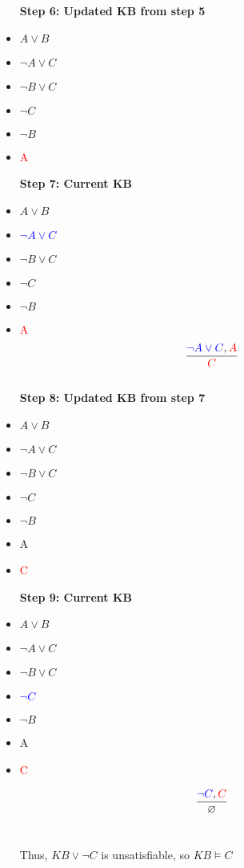 \documentclass{article}
\begin{document}
\begin{itemize}
    \textbf{Step 6: Updated KB from step 5}\\
    \item $A \lor B$
    \item $\neg A \lor C$
    \item $\neg B \lor C$
    \item $\neg C$
    \item $\neg B$
    \item \textcolor{red}{A}\\
    
    \par \textbf{Step 7: Current KB}\\
    \item $A \lor B$
    \item \textcolor{blue}{$\neg A \lor C$}
    \item $\neg B \lor C$
    \item $\neg C$
    \item $\neg B$
    \item \textcolor{red}{A}
    \[\frac{\textcolor{blue}{\neg A \lor C}, \textcolor{red}{A}}{\textcolor{red}{C}}\]\\
    
    \textbf{Step 8: Updated KB from step 7}\\
    \item $A \lor B$
    \item $\neg A \lor C$
    \item $\neg B \lor C$
    \item $\neg C$
    \item $\neg B$
    \item A
    \item \textcolor{red}{C}
    \pagebreak
    
    \textbf{Step 9: Current KB}
    \item $A \lor B$
    \item $\neg A \lor C$
    \item $\neg B \lor C$
    \item \textcolor{blue}{$\neg C$}
    \item $\neg B$
    \item A
    \item \textcolor{red}{C}
    
    \[\frac{\textcolor{blue}{\neg C}, \textcolor{red}{C}}\varnothing\]\\
    \begin{center}
        Thus, $KB \lor \neg C$ is unsatisfiable, so $KB \vDash C$
    \end{center}
    
    
\end{itemize}
\end{document}
